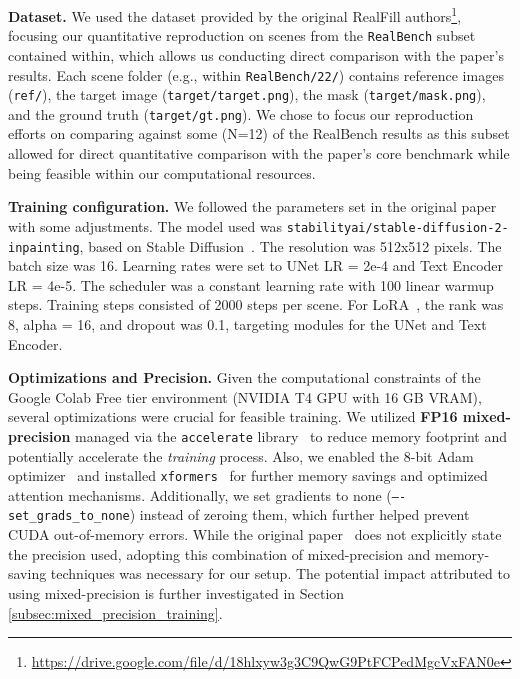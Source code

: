 \documentclass{article}
\begin{document}
\textbf{Dataset.} We used the dataset provided by the original RealFill authors\footnote{\url{https://drive.google.com/file/d/18hlxyw3g3C9QwG9PtFCPedMgcVxFAN0e}}, focusing our quantitative reproduction on scenes from the \texttt{RealBench} subset contained within, which allows us conducting direct comparison with the paper's results. Each scene folder (e.g., within \texttt{RealBench/22/}) contains reference images (\texttt{ref/}), the target image (\texttt{target/target.png}), the mask (\texttt{target/mask.png}), and the ground truth (\texttt{target/gt.png}). We chose to focus our reproduction efforts on comparing against some (N=12) of the RealBench results as this subset allowed for direct quantitative comparison with the paper's core benchmark while being feasible within our computational resources.

\textbf{Training configuration.} We followed the parameters set in the original paper~\cite{tang2024realfill} with some adjustments. The model used was \texttt{stabilityai/stable-diffusion-2-inpainting}, based on Stable Diffusion~\cite{rombach2022high}. The resolution was 512x512 pixels. The batch size was 16. Learning rates were set to UNet LR = 2e-4 and Text Encoder LR = 4e-5. The scheduler was a constant learning rate with 100 linear warmup steps. Training steps consisted of 2000 steps per scene. For LoRA~\cite{hu2022lora}, the rank was 8, alpha = 16, and dropout was 0.1, targeting modules for the UNet and Text Encoder.

\textbf{Optimizations and Precision.} Given the computational constraints of the Google Colab Free tier environment (NVIDIA T4 GPU with 16 GB VRAM), several optimizations were crucial for feasible training. We utilized \textbf{FP16 mixed-precision} managed via the \texttt{accelerate} library~\cite{accelerate} to reduce memory footprint and potentially accelerate the \emph{training} process. Also, we enabled the 8-bit Adam optimizer~\cite{dettmers2021_8bit} and installed \texttt{xformers}~\cite{xFormers2022} for further memory savings and optimized attention mechanisms. Additionally, we set gradients to none (\texttt{----set\_grads\_to\_none}) instead of zeroing them, which further helped prevent CUDA out-of-memory errors. While the original paper~\cite{tang2024realfill} does not explicitly state the precision used, adopting this combination of mixed-precision and memory-saving techniques was necessary for our setup. The potential impact attributed to using mixed-precision is further investigated in Section \ref{subsec:mixed_precision_training}.
\end{document}
